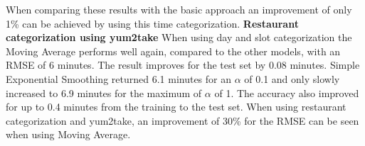 When comparing these results with the basic approach an improvement of only 1\% can be achieved by using this time categorization.
\newline\newline\textbf{Restaurant categorization using yum2take}\newline
When using day and slot categorization the Moving Average performs well again, compared to the other models, with an RMSE of 6 minutes. The result improves for the test set by 0.08 minutes. Simple Exponential Smoothing returned 6.1 minutes for an $\alpha$ of 0.1 and only slowly increased to 6.9 minutes for the maximum of $\alpha$ of 1. The accuracy also improved for up to 0.4 minutes from the training to the test set.\newline
When using restaurant categorization and yum2take, an improvement of 30\% for the RMSE can be seen when using Moving Average.
